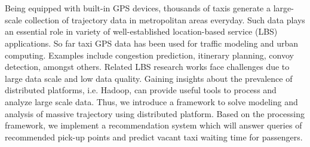 \newpage
\vspace{-1cm}
\chapter*{}
\vspace{-0.5cm}
Being equipped with built-in GPS devices, thousands of taxis generate a large-scale collection of trajectory data in metropolitan areas everyday. Such data plays an essential role in variety of well-established location-based service (LBS) applications. So far taxi GPS data has been used for traffic modeling and urban computing. Examples include congestion prediction, itinerary planning, convoy detection, amongst others. Related LBS research works face challenges due to large data scale and low data quality. Gaining insights about the prevalence of distributed platforms, i.e. Hadoop, can provide useful tools to process and analyze large scale data. Thus, we introduce a framework to solve modeling and analysis of massive trajectory using distributed platform. Based on the processing framework, we implement a recommendation system which will answer queries of recommended pick-up points and predict vacant taxi waiting time for passengers.

